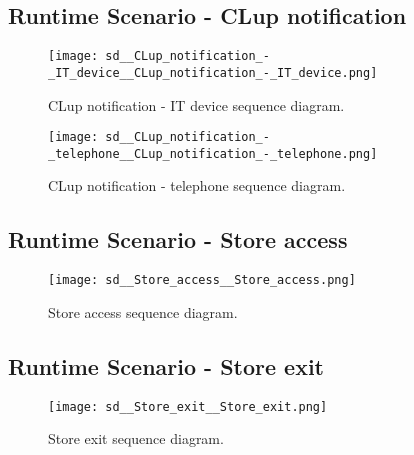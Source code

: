\documentclass[../../main.tex]{subfiles}
\begin{document}
\subsection{Runtime Scenario  - CLup notification}

\begin{figure}[H]
    \centering
    \texttt{[image: sd\_\_CLup\_notification\_-\_IT\_device\_\_CLup\_notification\_-\_IT\_device.png]}
    \caption{
        CLup notification - IT device sequence diagram.
    }
\end{figure}

\begin{figure}[H]
    \centering
    \texttt{[image: sd\_\_CLup\_notification\_-\_telephone\_\_CLup\_notification\_-\_telephone.png]}
    \caption{
        CLup notification - telephone sequence diagram.
    }
\end{figure}

\subsection{Runtime Scenario  - Store access}

\begin{figure}[H]
    \centering
    \texttt{[image: sd\_\_Store\_access\_\_Store\_access.png]}
    \caption{
        Store access sequence diagram.
    }
\end{figure}

\subsection{Runtime Scenario  - Store exit}

\begin{figure}[H]
    \centering
    \texttt{[image: sd\_\_Store\_exit\_\_Store\_exit.png]}
    \caption{
        Store exit sequence diagram.
    }
\end{figure}
\end{document}
